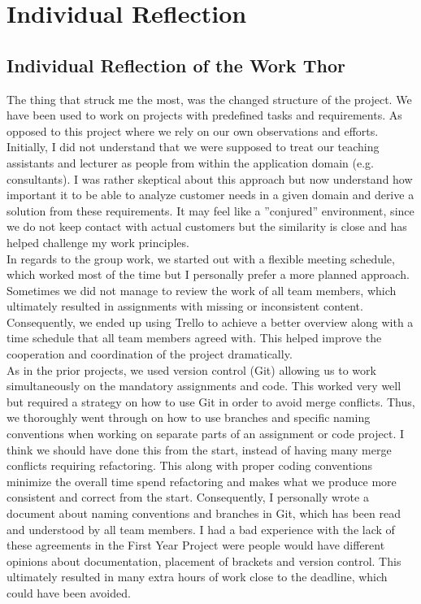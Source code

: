 \section{Individual Reflection}

\subsection{Individual Reflection of the Work Thor}
The thing that struck me the most, was the changed structure of the project. We have been used to work on projects with predefined tasks and requirements. As opposed to this project where we rely on our own observations and efforts. Initially, I did not understand that we were supposed to treat our teaching assistants and lecturer as people from within the application domain (e.g. consultants). I was rather skeptical about this approach but now understand how important it to be able to analyze customer needs in a given domain and derive a solution from these requirements. It may feel like a ”conjured” environment, since we do not keep contact with actual customers but the similarity is close and has helped challenge my work principles.\\

In regards to the group work, we started out with a flexible meeting schedule, which worked most of the time but I personally prefer a more planned approach. Sometimes we did not manage to review the work of all team members, which ultimately resulted in assignments with missing or inconsistent content. Consequently, we ended up using Trello to achieve a better overview along with a time schedule that all team members agreed with. This helped improve the cooperation and coordination of the project dramatically.\\

As in the prior projects, we used version control (Git) allowing us to work simultaneously on the mandatory assignments and code. This worked very well but required a strategy on how to use Git in order to avoid merge conflicts. Thus, we thoroughly went through on how to use branches and specific naming conventions when working on separate parts of an assignment or code project. I think we should have done this from the start, instead of having many merge conflicts requiring refactoring. This along with proper coding conventions minimize the overall time spend refactoring and makes what we produce more consistent and correct from the start. Consequently, I personally wrote a document about naming conventions and branches in Git, which has been read and understood by all team members. I had a bad experience with the lack of these agreements in the First Year Project were people would have different opinions about documentation, placement of brackets and version control. This ultimately resulted in many extra hours of work close to the deadline, which could have been avoided.\\

